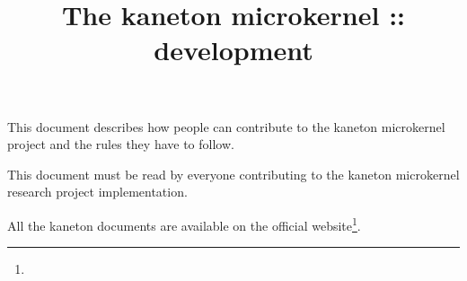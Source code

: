 %
%
%
%
%
%

%
%

%
%

\def\path{../..}

%
%



%
%


%
%

\title{The kaneton microkernel :: development \\
       \version
       \logo}

%
%



%
%

\maketitle

%
%

This document describes how people can contribute to the kaneton microkernel
project and the rules they have to follow.

\-

This document must be read by everyone contributing to the kaneton
microkernel research project implementation.

\-

All the kaneton documents are available on
  the official website\footnote{}.

%
%

\tableofcontents

%
%

\indentation{}

%
%











